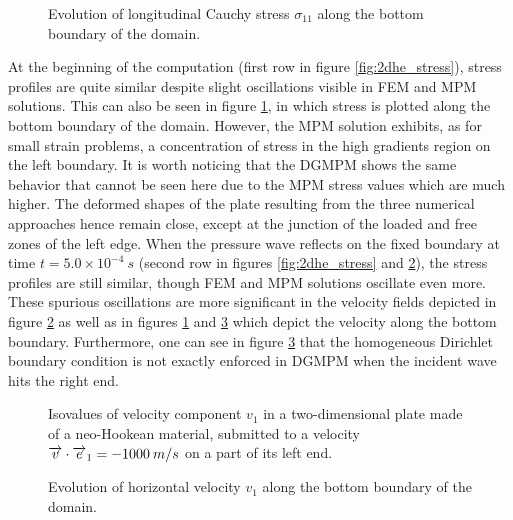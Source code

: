 \begin{figure}[h!]
  \centering
  
  \caption{Evolution of longitudinal Cauchy stress $\sigma_{11}$ along the bottom boundary of the domain.}
  \label{fig:he_lineplots_stress}
\end{figure}
At the beginning of the computation (first row in figure \ref{fig:2dhe_stress}), stress profiles are quite similar despite slight oscillations visible in FEM and MPM solutions.
This can also be seen in figure \ref{fig:he_lineplots_stress}, in which stress is plotted along the bottom boundary of the domain.
However, the MPM solution exhibits, as for small strain problems, a concentration of stress in the high gradients region on the left boundary.
It is worth noticing that the DGMPM shows the same behavior that cannot be seen here due to the MPM stress values which are much higher.
The deformed shapes of the plate resulting from the three numerical approaches hence remain close, except at the junction of the loaded and free zones of the left edge.
When the pressure wave reflects on the fixed boundary at time $t=5.0\times 10^{-4}\:s$ (second row in figures \ref{fig:2dhe_stress} and \ref{fig:2dhe_velo}), the stress profiles are still similar, though FEM and MPM solutions oscillate even more.
These spurious oscillations are more significant in the velocity fields depicted in figure \ref{fig:2dhe_velo} as well as in figures \ref{fig:he_lineplots_stress} and \ref{fig:he_lineplots_velo} which depict the velocity along the bottom boundary.
Furthermore, one can see in figure \ref{fig:he_lineplots_velo} that the homogeneous Dirichlet boundary condition is not exactly enforced in DGMPM when the incident wave hits the right end.
\begin{figure}[h!]
  \centering
  
  \caption{Isovalues of velocity component $v_1$ in a two-dimensional plate made of a neo-Hookean material, submitted to a velocity ${\overrightarrow{v}}\cdot{\overrightarrow{e}}_1=-1000 \: m/s$ on a part of its left end.}
  \label{fig:2dhe_velo}
\end{figure}
\begin{figure}[h!]
  \centering
  { \label{subfig:he_velo1}}
  { \label{subfig:he_velo2}}
  { \label{subfig:he_velo3}}
  
  \caption{Evolution of horizontal velocity $v_1$ along the bottom boundary of the domain.}
  \label{fig:he_lineplots_velo}
\end{figure}
